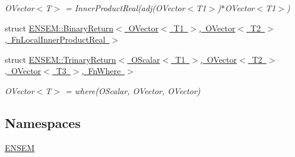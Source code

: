 \begin{DoxyCompactItemize}
\begin{DoxyCompactList}\small\item\em O\+Vector$<$\+T$>$ = Inner\+Product\+Real(adj(\+O\+Vector$<$\+T1$>$)$\ast$\+O\+Vector$<$\+T1$>$) \end{DoxyCompactList}\item 
struct \mbox{\hyperlink{structENSEM_1_1BinaryReturn_3_01OVector_3_01T1_01_4_00_01OVector_3_01T2_01_4_00_01FnLocalInnerProductReal_01_4}{E\+N\+S\+E\+M\+::\+Binary\+Return$<$ O\+Vector$<$ T1 $>$, O\+Vector$<$ T2 $>$, Fn\+Local\+Inner\+Product\+Real $>$}}
\item 
struct \mbox{\hyperlink{structENSEM_1_1TrinaryReturn_3_01OScalar_3_01T1_01_4_00_01OVector_3_01T2_01_4_00_01OVector_3_01T3_01_4_00_01FnWhere_01_4}{E\+N\+S\+E\+M\+::\+Trinary\+Return$<$ O\+Scalar$<$ T1 $>$, O\+Vector$<$ T2 $>$, O\+Vector$<$ T3 $>$, Fn\+Where $>$}}
\begin{DoxyCompactList}\small\item\em O\+Vector$<$\+T$>$ = where(\+O\+Scalar, O\+Vector, O\+Vector) \end{DoxyCompactList}\end{DoxyCompactItemize}
\subsection*{Namespaces}
\begin{DoxyCompactItemize}
\item 
 \mbox{\hyperlink{namespaceENSEM}{E\+N\+S\+EM}}
\end{DoxyCompactItemize}
